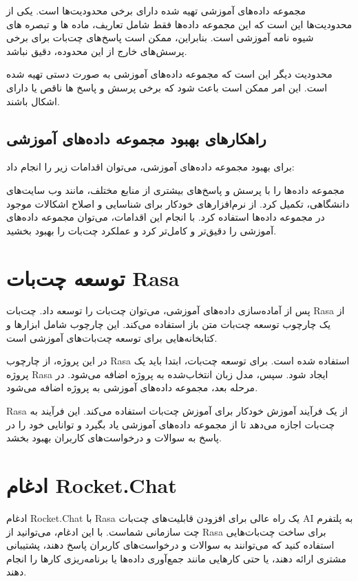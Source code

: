 مجموعه داده‌های آموزشی تهیه شده دارای برخی محدودیت‌ها است. یکی از محدودیت‌ها این است که این مجموعه داده‌ها فقط شامل تعاریف، ماده ها و تبصره های شیوه نامه آموزشی است. بنابراین، ممکن است پاسخ‌های چت‌بات برای برخی پرسش‌های خارج از این محدوده، دقیق نباشد.

محدودیت دیگر این است که مجموعه داده‌های آموزشی به صورت دستی تهیه شده است. این امر ممکن است باعث شود که برخی پرسش و پاسخ ها ناقص یا دارای اشکال باشند.

\subsection{راهکارهای بهبود مجموعه داده‌های آموزشی}

برای بهبود مجموعه داده‌های آموزشی، می‌توان اقدامات زیر را انجام داد:

مجموعه داده‌ها را با پرسش و پاسخ‌های بیشتری از منابع مختلف، مانند وب سایت‌های دانشگاهی، تکمیل کرد.
از نرم‌افزارهای خودکار برای شناسایی و اصلاح اشکالات موجود در مجموعه داده‌ها استفاده کرد.
با انجام این اقدامات، می‌توان مجموعه داده‌های آموزشی را دقیق‌تر و کامل‌تر کرد و عملکرد چت‌بات را بهبود بخشید.


\section{توسعه چت‌بات Rasa}

پس از آماده‌سازی داده‌های آموزشی، می‌توان چت‌بات را توسعه داد. چت‌بات Rasa از یک چارچوب توسعه چت‌بات متن باز استفاده می‌کند. این چارچوب شامل ابزارها و کتابخانه‌هایی برای توسعه چت‌بات‌های آموزشی است.

در این پروژه، از چارچوب Rasa استفاده شده است. برای توسعه چت‌بات، ابتدا باید یک پروژه Rasa ایجاد شود. سپس، مدل زبان انتخاب‌شده به پروژه اضافه می‌شود. در مرحله بعد، مجموعه داده‌های آموزشی به پروژه اضافه می‌شود.

Rasa از یک فرآیند آموزش خودکار برای آموزش چت‌بات استفاده می‌کند. این فرآیند به چت‌بات اجازه می‌دهد تا از مجموعه داده‌های آموزشی یاد بگیرد و توانایی خود را در پاسخ به سوالات و درخواست‌های کاربران بهبود بخشد.

\section{ادغام Rocket.Chat}

ادغام Rocket.Chat با Rasa یک راه عالی برای افزودن قابلیت‌های چت‌بات AI به پلتفرم چت سازمانی شماست. با این ادغام، می‌توانید از Rasa برای ساخت چت‌بات‌هایی استفاده کنید که می‌توانند به سوالات و درخواست‌های کاربران پاسخ دهند، پشتیبانی مشتری ارائه دهند، یا حتی کارهایی مانند جمع‌آوری داده‌ها یا برنامه‌ریزی کارها را انجام دهند.




\newpage